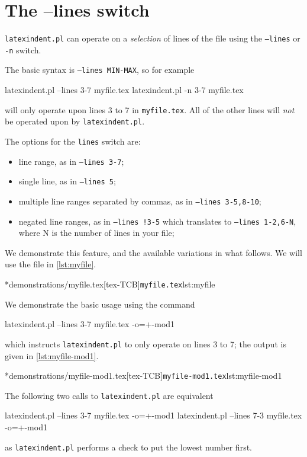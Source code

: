 \section{The --lines switch}\label{sec:line-switch}
 \texttt{latexindent.pl}
  can
 operate on a \emph{selection} of lines of the file using the \texttt{--lines} or
 \texttt{-n} switch.


 The basic syntax is \texttt{--lines MIN-MAX}, so for example
 \begin{commandshell}
latexindent.pl --lines 3-7 myfile.tex
latexindent.pl -n 3-7 myfile.tex
\end{commandshell}
 will only operate upon lines 3 to 7 in \texttt{myfile.tex}. All of the other lines will
 \emph{not} be operated upon by \texttt{latexindent.pl}.

 The options for the \texttt{lines} switch are:
 \begin{itemize}
	 \item line range, as in \texttt{--lines 3-7};
	 \item single line, as in \texttt{--lines 5};
	 \item multiple line ranges separated by commas, as in \texttt{--lines 3-5,8-10};
	 \item negated line ranges, as in \texttt{--lines !3-5} which translates to \texttt{--lines
		       1-2,6-N}, where N is the number of lines in your file;
 \end{itemize}

 We demonstrate this feature, and the available variations in what follows. We will use
 the file in \cref{lst:myfile}.

 \cmhlistingsfromfile*[numbers=left,numberstyle=\color{blue},]*{demonstrations/myfile.tex}[tex-TCB]{\texttt{myfile.tex}}{lst:myfile}

 \begin{example}
	 We demonstrate the basic usage using the command
	 \begin{commandshell}
latexindent.pl --lines 3-7 myfile.tex -o=+-mod1
\end{commandshell}
	 which instructs \texttt{latexindent.pl} to only operate on lines 3 to 7; the output is given in \cref{lst:myfile-mod1}.

	 \cmhlistingsfromfile*[numbers=left,numberstyle=\color{blue},]*{demonstrations/myfile-mod1.tex}[tex-TCB]{\texttt{myfile-mod1.tex}}{lst:myfile-mod1}

	 The following two calls to \texttt{latexindent.pl} are equivalent
	 \begin{commandshell}
latexindent.pl --lines 3-7 myfile.tex -o=+-mod1
latexindent.pl --lines 7-3 myfile.tex -o=+-mod1
\end{commandshell}
	 as \texttt{latexindent.pl} performs a check to put the lowest number first.
 \end{example}

